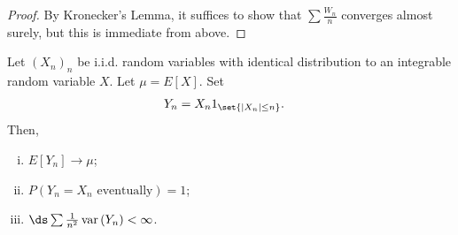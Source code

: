 \documentclass[10pt]{mypackage}
\begin{document}
\begin{proof}
  By Kronecker's Lemma, it suffices to show that $\sum \frac{W_n}{n}$ converges almost surely, but this is immediate from above.
\end{proof}
\begin{lemma}
  Let $\left( X_n \right)_n$ be i.i.d. random variables with identical distribution to an integrable random variable $X$. Let $\mu = E\left[ X \right]$. Set
  \begin{align*}
    Y_n &= X_n1_{\set{\left\vert X_n \right\vert\leq n}}.
  \end{align*}
  Then,
  \begin{enumerate}[(i)]
    \item $E\left[ Y_n \right]\to \mu$;
    \item $P\left( Y_n = X_n\text{ eventually} \right) = 1$;
    \item $\ds \sum \frac{1}{n^2}\operatorname{var}\left( Y_n \right) < \infty$.
  \end{enumerate}
\end{lemma}
\end{document}
